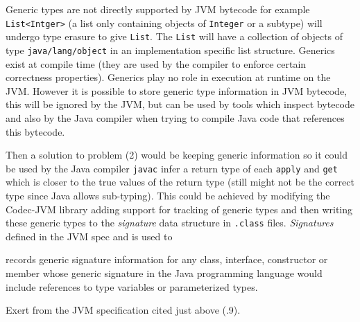 \documentclass[float=false, crop=false]{standalone}
\begin{document}
Generic types are not directly supported by JVM bytecode for example
\verb|List<Intger>| (a list only containing objects of \verb|Integer| or a subtype)
will undergo type erasure to give \verb|List|. The \verb|List| 
will have a collection of objects of type \verb|java/lang/object| in an implementation
specific list structure. 
Generics exist at compile time (they are used by the compiler to enforce 
certain correctness properties). Generics play no role in execution at runtime
on the JVM. However it is possible to store generic type information
in JVM bytecode, this will be ignored by the JVM, but can be used by tools
which inspect bytecode and also by the Java compiler when trying to compile
Java code that references this bytecode.

Then a solution to problem (2) would be keeping generic information so it 
could be used by the Java compiler \texttt{javac} infer a return type of 
each \texttt{apply} and \texttt{get} which is closer to the true 
values of the return type (still might not be the correct type 
since Java allows sub-typing). 
This could be achieved by modifying the Codec-JVM library 
\cite{codec-jvm-link} adding support for tracking of generic types and then 
writing these generic types to the \textit{signature} data structure in 
\verb|.class| files. \textit{Signatures} defined in the JVM spec
\cite[.9]{jvm-spec8} and is used to 
\begin{displayquote}
  records generic signature information for any class, interface, 
  constructor or member whose generic signature in the Java 
  programming language would include references to type variables 
  or parameterized types.
\end{displayquote}
\begin{flushright}
Exert from the JVM specification cited just above (.9).
\end{flushright}
\end{document}
